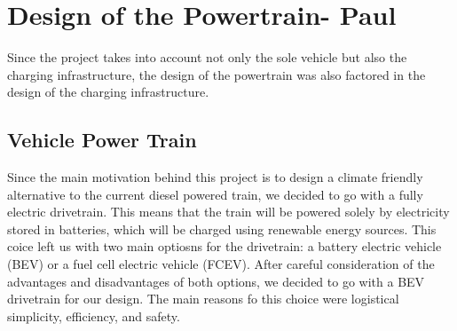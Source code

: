 \section{Design of the Powertrain- Paul}\label{sec:powertrain}





Since the project takes into account not only the sole vehicle but also the charging infrastructure, the design of the powertrain was also factored in the design of the charging infrastructure.

\subsection{Vehicle Power Train}
Since the main motivation behind this project is to design a climate friendly alternative to the current diesel powered train, we decided to go with a fully electric drivetrain. This means that the train will be powered solely by electricity stored in batteries, which will be charged using renewable energy sources. This coice left us with two main optiosns for the drivetrain: a battery electric vehicle (BEV) or a fuel cell electric vehicle (FCEV). After careful consideration of the advantages and disadvantages of both options, we decided to go with a BEV drivetrain for our design. The main reasons fo this choice were logistical simplicity, efficiency, and safety.

